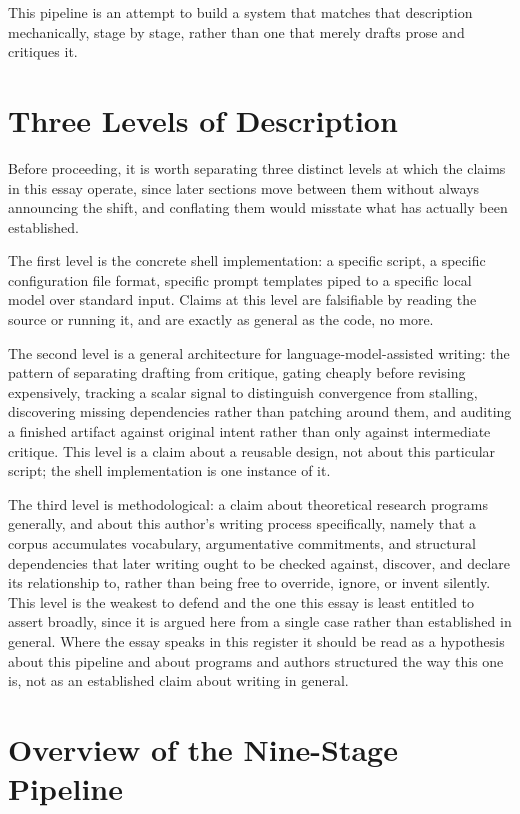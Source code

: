 \documentclass[11pt]{article}
\theoremstyle{definition}
\begin{document}
This pipeline is an attempt to build a system that matches that
description mechanically, stage by stage, rather than one that merely
drafts prose and critiques it.

\section{Three Levels of Description}
\label{sec:levels}

Before proceeding, it is worth separating three distinct levels at
which the claims in this essay operate, since later sections move
between them without always announcing the shift, and conflating them
would misstate what has actually been established.

The first level is the concrete shell implementation: a specific
script, a specific configuration file format, specific prompt templates
piped to a specific local model over standard input. Claims at this
level are falsifiable by reading the source or running it, and are
exactly as general as the code, no more.

The second level is a general architecture for language-model-assisted
writing: the pattern of separating drafting from critique, gating
cheaply before revising expensively, tracking a scalar signal to
distinguish convergence from stalling, discovering missing dependencies
rather than patching around them, and auditing a finished artifact
against original intent rather than only against intermediate critique.
This level is a claim about a reusable design, not about this
particular script; the shell implementation is one instance of it.

The third level is methodological: a claim about theoretical research
programs generally, and about this author's writing process
specifically, namely that a corpus accumulates vocabulary,
argumentative commitments, and structural dependencies that later
writing ought to be checked against, discover, and declare its
relationship to, rather than being free to override, ignore, or invent
silently. This level is the weakest to defend and the one this essay is
least entitled to assert broadly, since it is argued here from a single
case rather than established in general. Where the essay speaks in this
register it should be read as a hypothesis about this pipeline and
about programs and authors structured the way this one is, not as an
established claim about writing in general.

\section{Overview of the Nine-Stage Pipeline}
\label{sec:overview}
\end{document}
